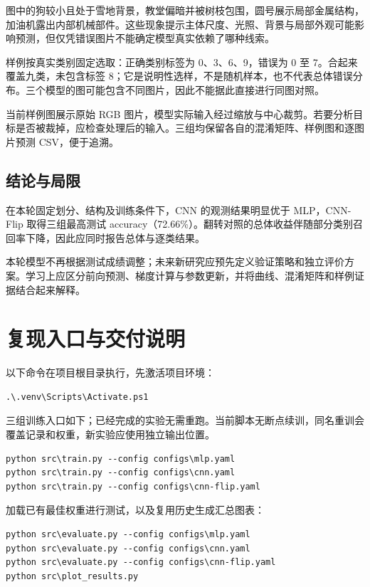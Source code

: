 \documentclass[UTF8,a4paper,zihao=-4,fontset=windows]{ctexart}
\begin{document}
图中的狗较小且处于雪地背景，教堂偏暗并被树枝包围，圆号展示局部金属结构，加油机露出内部机械部件。这些现象提示主体尺度、光照、背景与局部外观可能影响预测，但仅凭错误图片不能确定模型真实依赖了哪种线索。

样例按真实类别固定选取：正确类别标签为 0、3、6、9，错误为 0 至 7。合起来覆盖九类，未包含标签 8；它是说明性选样，不是随机样本，也不代表总体错误分布。三个模型的图可能包含不同图片，因此不能据此直接进行同图对照。

当前样例图展示原始 RGB 图片，模型实际输入经过缩放与中心裁剪。若要分析目标是否被裁掉，应检查处理后的输入。三组均保留各自的混淆矩阵、样例图和逐图片预测 CSV，便于追溯。

\subsection{结论与局限}
在本轮固定划分、结构及训练条件下，CNN 的观测结果明显优于 MLP，CNN-Flip 取得三组最高测试 accuracy（72.66\%）。翻转对照的总体收益伴随部分类别召回率下降，因此应同时报告总体与逐类结果。

本轮模型不再根据测试成绩调整；未来新研究应预先定义验证策略和独立评价方案。学习上应区分前向预测、梯度计算与参数更新，并将曲线、混淆矩阵和样例证据结合起来解释。

\clearpage
\section{复现入口与交付说明}
以下命令在项目根目录执行，先激活项目环境：
\begin{verbatim}
.\.venv\Scripts\Activate.ps1
\end{verbatim}
三组训练入口如下；已经完成的实验无需重跑。当前脚本无断点续训，同名重训会覆盖记录和权重，新实验应使用独立输出位置。
\begin{verbatim}
python src\train.py --config configs\mlp.yaml
python src\train.py --config configs\cnn.yaml
python src\train.py --config configs\cnn-flip.yaml
\end{verbatim}
加载已有最佳权重进行测试，以及复用历史生成汇总图表：
\begin{verbatim}
python src\evaluate.py --config configs\mlp.yaml
python src\evaluate.py --config configs\cnn.yaml
python src\evaluate.py --config configs\cnn-flip.yaml
python src\plot_results.py
\end{verbatim}
\end{document}
